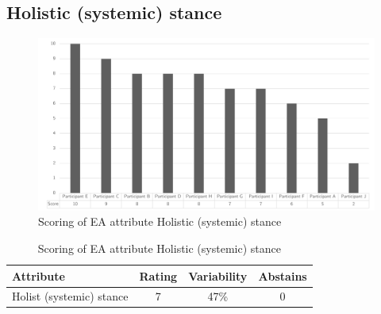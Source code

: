 \subsection{Holistic (systemic) stance}
\begin{figure}[h!]
	\centering
	\includegraphics[width=0.9\linewidth]{images/scoreeaholisticsystemsstance}
	\caption[Scoring of EA attribute Holistic (systemic) stance]{Scoring of EA attribute Holistic (systemic) stance}
	\label{fig:appscoringeaholisticsystemsstance}
\end{figure}
\begin{table}[h!]
	\centering
	\begin{tabular}{p{}ccc}
		\toprule
		\textbf{Attribute} & \textbf{Rating} & \textbf{Variability} & \textbf{Abstains} \\
		\midrule
		Holist (systemic) stance & 7 & 47\% & 0 \\%
		\bottomrule
	\end{tabular}%
	\caption[Scoring of EA attribute Holistic (systemic) stance]{Scoring of EA attribute Holistic (systemic) stance}
	\label{tab:appscoringeaholisticsystemsstance}%
\end{table}%
\newpage
